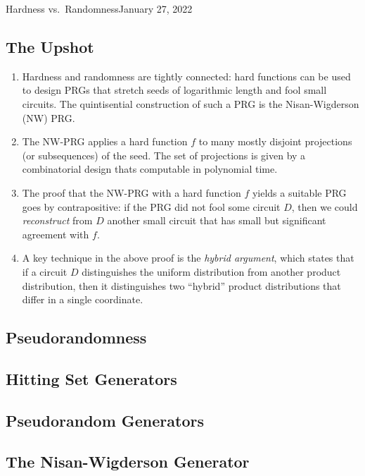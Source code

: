 \begin{lecture}{2}{Hardness vs.\ Randomness}{January 27, 2022}
\label{lec:02}

\subsection*{The Upshot}

\begin{enumerate}
  \item Hardness and randomness are tightly connected: hard functions can be
    used to design PRGs that stretch seeds of logarithmic length and fool small
    circuits. The quintisential construction of such a PRG is the
    Nisan-Wigderson (NW) PRG.
  \item The NW-PRG applies a hard function $f$ to many mostly disjoint
    projections (or subsequences) of the seed. The set of projections is given
    by a combinatorial design thats computable in polynomial time.
  \item The proof that the NW-PRG with a hard function $f$ yields a suitable
    PRG goes by contrapositive: if the PRG did not fool some circuit $D$, then we
    could \emph{reconstruct} from $D$ another small circuit that has small but
    significant agreement with $f$.
  \item A key technique in the above proof is the \emph{hybrid argument}, which
    states that if a circuit $D$ distinguishes the uniform distribution from
    another product distribution, then it distinguishes two ``hybrid'' product
    distributions that differ in a single coordinate.
\end{enumerate}

\subsection{Pseudorandomness}

\subsection{Hitting Set Generators}

\subsection{Pseudorandom Generators}

\subsection{The Nisan-Wigderson Generator}


\end{lecture}
